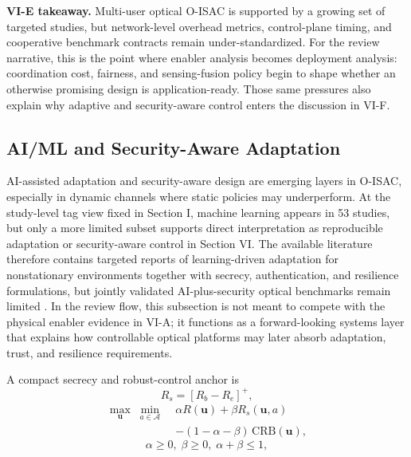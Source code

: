 \documentclass[lettersize,journal]{IEEEtran}
\begin{document}
\textbf{VI-E takeaway.} Multi-user optical O-ISAC is supported by a growing set of targeted studies, but network-level overhead metrics, control-plane timing, and cooperative benchmark contracts remain under-standardized. For the review narrative, this is the point where enabler analysis becomes deployment analysis: coordination cost, fairness, and sensing-fusion policy begin to shape whether an otherwise promising design is application-ready. Those same pressures also explain why adaptive and security-aware control enters the discussion in VI-F.

\subsection{AI/ML and Security-Aware Adaptation}

AI-assisted adaptation and security-aware design are emerging layers in O-ISAC, especially in dynamic channels where static policies may underperform. At the study-level tag view fixed in Section I, machine learning appears in 53 studies, but only a more limited subset supports direct interpretation as reproducible adaptation or security-aware control in Section VI. The available literature therefore contains targeted reports of learning-driven adaptation for nonstationary environments together with secrecy, authentication, and resilience formulations, but jointly validated AI-plus-security optical benchmarks remain limited \cite{O_ISAC_127,O_ISAC_145,O_ISAC_156,O_ISAC_163}. In the review flow, this subsection is not meant to compete with the physical enabler evidence in VI-A; it functions as a forward-looking systems layer that explains how controllable optical platforms may later absorb adaptation, trust, and resilience requirements.

A compact secrecy and robust-control anchor is
\begin{equation}
R_s=[R_b-R_e]^+,
\end{equation}
\begin{equation}
\begin{split}
\max_{\mathbf{u}}\;\min_{a\in\mathcal A}\;&\alpha R(\mathbf{u})+\beta R_s(\mathbf{u},a)\\
&-(1-\alpha-\beta)\,\mathrm{CRB}(\mathbf{u}),
\end{split}
\end{equation}
\begin{equation}
\alpha\ge 0,\;\beta\ge 0,\;\alpha+\beta\le 1,
\end{equation}
\end{document}
